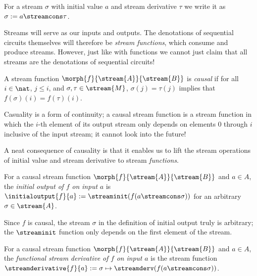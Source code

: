 \begin{notation}
    For a stream \(\sigma\) with initial value \(a\) and stream derivative
    \(\tau\) we write it as \(\sigma := a \streamcons \tau\).
\end{notation}

Streams will serve as our inputs and outputs.
The denotations of sequential circuits themselves will therefore be
\emph{stream functions}, which consume and produce streams.
However, just like with functions we cannot just claim that all streams are the
denotations of sequential circuits!

\begin{definition}
    A stream function \(\morph{f}{\stream{A}}{\stream{B}}\) is \emph{causal} if
    for all \(i \in \nat\), \(j \leq i\), and \(\sigma,\tau \in \stream{M}\),
    \(\sigma(j) = \tau(j)\) implies that \(f(\sigma)(i) = f(\tau)(i)\).
\end{definition}

Casuality is a form of continuity; a causal stream function is a stream function
in which the \(i\)-th element of its output stream only depends on elements
\(0\) through \(i\) inclusive of the input stream; it cannot look into the
future!

A neat consequence of causality is that it enables us to lift the stream
operations of initial value and stream derivative to stream \emph{functions}.

\begin{definition}
    For a causal stream function \(\morph{f}{\stream{A}}{\stream{B}}\) and
    \(a \in A\), the \emph{initial output of \(f\) on input \(a\)} is
    \(\initialoutput{f}{a} := \streaminit(f(a \streamcons \sigma))\) for an
    arbitrary \(\sigma \in \stream{A}\).
\end{definition}

Since \(f\) is causal, the stream \(\sigma\) in the definition of initial
output truly is arbitrary; the \(\streaminit\) function only depends on the
first element of the stream.

\begin{definition}
    For a causal stream function \(\morph{f}{\stream{A}}{\stream{B}}\) and
    \(a \in A\), the
    \emph{functional stream derivative of \(f\) on input \(a\)} is the
    stream function \(
        \streamderivative{f}{a}
        :=
        \sigma \mapsto \streamderv(f(a \streamcons \sigma))
    \).
\end{definition}

